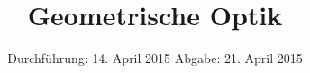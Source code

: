 
\subject{Anfängerpraktikum V408}
\title{Geometrische Optik}
\date{
  Durchführung: 14. April 2015
  \hspace{1em}
  Abgabe: 21. April 2015
}


\maketitle
\thispagestyle{empty}
\newpage





\newpage
\printbibliography



